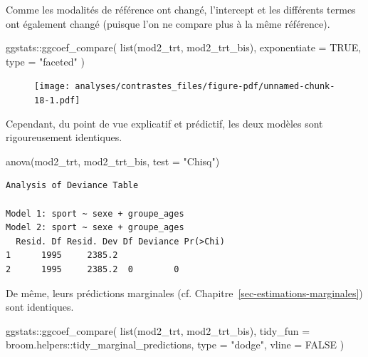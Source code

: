 \documentclass[
  letterpaper,
  DIV=11,
  numbers=noendperiod,
  oneside]{scrreprt}
\newenvironment{Shaded}{\begin{snugshade}}{\end{snugshade}}
\newcommand{\AttributeTok}[1]{\textcolor[rgb]{0.40,0.45,0.13}{#1}}
\newcommand{\ConstantTok}[1]{\textcolor[rgb]{0.56,0.35,0.01}{#1}}
\newcommand{\FunctionTok}[1]{\textcolor[rgb]{0.28,0.35,0.67}{#1}}
\newcommand{\NormalTok}[1]{\textcolor[rgb]{0.00,0.23,0.31}{#1}}
\newcommand{\SpecialCharTok}[1]{\textcolor[rgb]{0.37,0.37,0.37}{#1}}
\newcommand{\StringTok}[1]{\textcolor[rgb]{0.13,0.47,0.30}{#1}}
\begin{document}
Comme les modalités de référence ont changé, l'intercept et les
différents termes ont également changé (puisque l'on ne compare plus à
la même référence).

\begin{Shaded}
\begin{Highlighting}[]
\NormalTok{ggstats}\SpecialCharTok{::}\FunctionTok{ggcoef\_compare}\NormalTok{(}
  \FunctionTok{list}\NormalTok{(mod2\_trt, mod2\_trt\_bis),}
  \AttributeTok{exponentiate =} \ConstantTok{TRUE}\NormalTok{,}
  \AttributeTok{type =} \StringTok{"faceted"}
\NormalTok{)}
\end{Highlighting}
\end{Shaded}

\begin{figure}[H]

{\centering \texttt{[image: analyses/contrastes\_files/figure-pdf/unnamed-chunk-18-1.pdf]}

}

\end{figure}

Cependant, du point de vue explicatif et prédictif, les deux modèles
sont rigoureusement identiques.

\begin{Shaded}
\begin{Highlighting}[]
\FunctionTok{anova}\NormalTok{(mod2\_trt, mod2\_trt\_bis, }\AttributeTok{test =} \StringTok{"Chisq"}\NormalTok{)}
\end{Highlighting}
\end{Shaded}

\begin{verbatim}
Analysis of Deviance Table

Model 1: sport ~ sexe + groupe_ages
Model 2: sport ~ sexe + groupe_ages
  Resid. Df Resid. Dev Df Deviance Pr(>Chi)
1      1995     2385.2                     
2      1995     2385.2  0        0         
\end{verbatim}

De même, leurs prédictions marginales (cf.
Chapitre~\ref{sec-estimations-marginales}) sont identiques.

\begin{Shaded}
\begin{Highlighting}[]
\NormalTok{ggstats}\SpecialCharTok{::}\FunctionTok{ggcoef\_compare}\NormalTok{(}
  \FunctionTok{list}\NormalTok{(mod2\_trt, mod2\_trt\_bis),}
  \AttributeTok{tidy\_fun =}\NormalTok{ broom.helpers}\SpecialCharTok{::}\NormalTok{tidy\_marginal\_predictions,}
  \AttributeTok{type =} \StringTok{"dodge"}\NormalTok{,}
  \AttributeTok{vline =} \ConstantTok{FALSE}
\NormalTok{)}
\end{Highlighting}
\end{Shaded}
\end{document}
